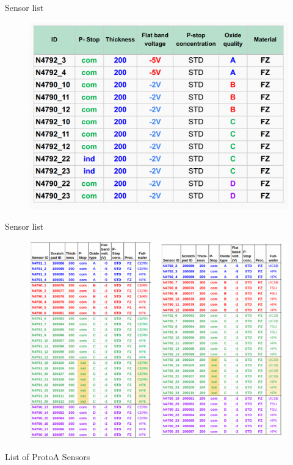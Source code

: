 \documentclass{beamer}
\begin{document}
\begin{frame}{Sensor list}
   \begin{figure}
       \includegraphics[width=.8\textwidth]{plots/winter2022_sensorList.png}
   \end{figure} 
\end{frame}

\begin{frame}{Sensor list}
   \begin{figure}
       \includegraphics[width=.8\textwidth]{plots/Fall_2021_sensorList.png}
   \end{figure} 
\end{frame}


\begin{frame}{List of ProtoA Sensors}
    
\end{frame}
\end{document}
